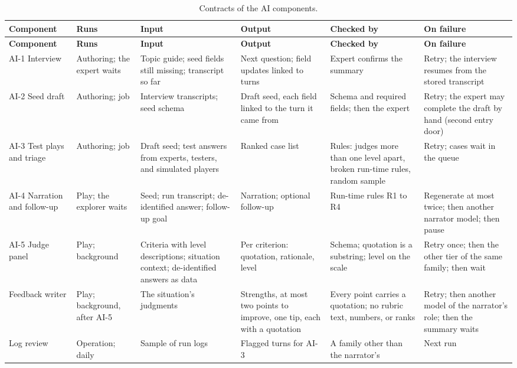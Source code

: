 {\footnotesize
\begin{longtable}{|>{\raggedright\arraybackslash}p{}|>{\raggedright\arraybackslash}p{}|>{\raggedright\arraybackslash}p{}|>{\raggedright\arraybackslash}p{}|>{\raggedright\arraybackslash}p{}|>{\raggedright\arraybackslash}p{}|}
\caption{Contracts of the AI components.} \\
\hline
\textbf{Component} & \textbf{Runs} & \textbf{Input} & \textbf{Output} & \textbf{Checked by} & \textbf{On failure} \\ \hline
\endfirsthead
\hline
\textbf{Component} & \textbf{Runs} & \textbf{Input} & \textbf{Output} & \textbf{Checked by} & \textbf{On failure} \\ \hline
\endhead
AI-1 Interview & Authoring; the expert waits & Topic guide; seed fields still missing; transcript so far & Next question; field updates linked to turns & Expert confirms the summary & Retry; the interview resumes from the stored transcript \\ \hline
AI-2 Seed draft & Authoring; job & Interview transcripts; seed schema & Draft seed, each field linked to the turn it came from & Schema and required fields; then the expert & Retry; the expert may complete the draft by hand (second entry door) \\ \hline
AI-3 Test plays and triage & Authoring; job & Draft seed; test answers from experts, testers, and simulated players & Ranked case list & Rules: judges more than one level apart, broken run-time rules, random sample & Retry; cases wait in the queue \\ \hline
AI-4 Narration and follow-up & Play; the explorer waits & Seed; run transcript; de-identified answer; follow-up goal & Narration; optional follow-up & Run-time rules R1 to R4 & Regenerate at most twice; then another narrator model; then pause \\ \hline
AI-5 Judge panel & Play; background & Criteria with level descriptions; situation context; de-identified answers as data & Per criterion: quotation, rationale, level & Schema; quotation is a substring; level on the scale & Retry once; then the other tier of the same family; then wait \\ \hline
Feedback writer & Play; background, after AI-5 & The situation's judgments & Strengths, at most two points to improve, one tip, each with a quotation & Every point carries a quotation; no rubric text, numbers, or ranks & Retry; then another model of the narrator's role; then the summary waits \\ \hline
Log review & Operation; daily & Sample of run logs & Flagged turns for AI-3 & A family other than the narrator's & Next run \\ \hline
\end{longtable}
}


